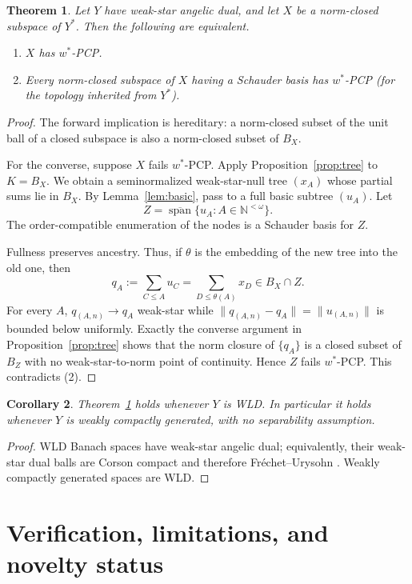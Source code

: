 \documentclass[11pt]{article}
\newtheorem{theorem}{Theorem}
\newtheorem{corollary}[theorem]{Corollary}
\newcommand{\N}{\mathbb N}
\begin{document}
\begin{theorem}\label{thm:main}
Let $Y$ have weak-star angelic dual, and let $X$ be a norm-closed subspace of
$Y^*$.  Then the following are equivalent.
\begin{enumerate}
\item $X$ has $w^*$-PCP.
\item Every norm-closed subspace of $X$ having a Schauder basis has
$w^*$-PCP (for the topology inherited from $Y^*$).
\end{enumerate}
\end{theorem}

\begin{proof}
The forward implication is hereditary: a norm-closed subset of the unit ball
of a closed subspace is also a norm-closed subset of $B_X$.

For the converse, suppose $X$ fails $w^*$-PCP.  Apply
Proposition~\ref{prop:tree} to $K=B_X$.  We obtain a seminormalized
weak-star-null tree $(x_A)$ whose partial sums lie in $B_X$.  By
Lemma~\ref{lem:basic}, pass to a full basic subtree $(u_A)$.  Let
\[
Z=\overline{\operatorname{span}}\{u_A:A\in\N^{<\omega}\}.
\]
The order-compatible enumeration of the nodes is a Schauder basis for $Z$.

Fullness preserves ancestry.  Thus, if $\theta$ is the embedding of the new
tree into the old one, then
\[
q_A:=\sum_{C\leq A}u_C
=\sum_{D\leq\theta(A)}x_D\in B_X\cap Z.
\]
For every $A$, $q_{(A,n)}\to q_A$ weak-star while
$\|q_{(A,n)}-q_A\|=\|u_{(A,n)}\|$ is bounded below uniformly.  Exactly the
converse argument in Proposition~\ref{prop:tree} shows that the norm closure
of $\{q_A\}$ is a closed subset of $B_Z$ with no weak-star-to-norm point of
continuity.  Hence $Z$ fails $w^*$-PCP.  This contradicts (2).
\end{proof}

\begin{corollary}\label{cor:wld}
Theorem~\ref{thm:main} holds whenever $Y$ is WLD.  In particular it holds
whenever $Y$ is weakly compactly generated, with no separability assumption.
\end{corollary}

\begin{proof}
WLD Banach spaces have weak-star angelic dual; equivalently, their weak-star
dual balls are Corson compact and therefore Fr\'echet--Urysohn
\cite{MC}.  Weakly compactly generated spaces are WLD.
\end{proof}

\section*{Verification, limitations, and novelty status}
\end{document}

